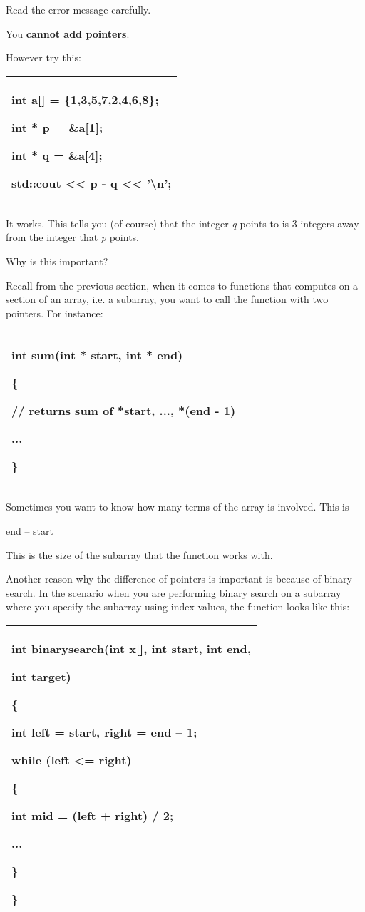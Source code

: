 \documentclass[
]{article}
\begin{document}
Read the error message carefully.

You \textbf{cannot add pointers}.

However try this:

\begin{longtable}[]{@{}l@{}}
\toprule
\endhead
\begin{minipage}[t]{0.97\columnwidth}\raggedright
int a{[}{]} = \{1,3,5,7,2,4,6,8\};

int * p = \&a{[}1{]};

int * q = \&a{[}4{]};

std::cout \textless\textless{} \textbf{p - q} \textless\textless{}
'\textbackslash n';\strut
\end{minipage}\tabularnewline
\bottomrule
\end{longtable}

It works. This tells you (of course) that the integer \emph{q} points to
is 3 integers away from the integer that \emph{p} points.

Why is this important?

Recall from the previous section, when it comes to functions that
computes on a section of an array, i.e. a subarray, you want to call the
function with two pointers. For instance:

\begin{longtable}[]{@{}l@{}}
\toprule
\endhead
\begin{minipage}[t]{0.97\columnwidth}\raggedright
int sum(int * start, int * end)

\{

// returns sum of *start, ..., *(end - 1)

...

\}\strut
\end{minipage}\tabularnewline
\bottomrule
\end{longtable}

Sometimes you want to know how many terms of the array is involved. This
is

end -- start

This is the size of the subarray that the function works with.

Another reason why the difference of pointers is important is because of
binary search. In the scenario when you are performing binary search on
a subarray where you specify the subarray using index values, the
function looks like this:

\begin{longtable}[]{@{}l@{}}
\toprule
\endhead
\begin{minipage}[t]{0.97\columnwidth}\raggedright
int binarysearch(int x{[}{]}, int start, int end,

int target)

\{

int left = start, right = end -- 1;

while (left \textless= right)

\{

int mid = (left + right) / 2;

...

\}

\}\strut
\end{minipage}\tabularnewline
\bottomrule
\end{longtable}
\end{document}
